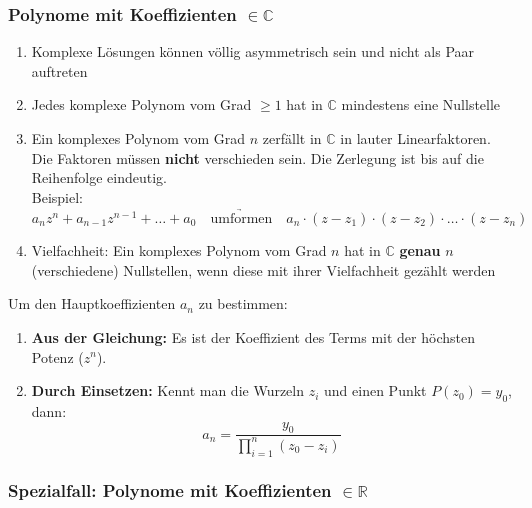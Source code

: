 \subsubsection{Polynome mit Koeffizienten $\bm{\in \mathbb{C}}$}


\smallskip

\begin{enumerate}[itemsep=0.2cm]
    \item Komplexe Lösungen können völlig asymmetrisch sein und nicht als Paar auftreten
    \item Jedes komplexe Polynom vom Grad $\geq 1$ hat in $\mathbb{C}$ mindestens eine Nullstelle
    \item Ein komplexes Polynom vom Grad $n$ zerfällt in $\mathbb{C}$ in lauter Linearfaktoren. \\
          Die Faktoren müssen \textbf{nicht} verschieden sein. Die Zerlegung ist bis auf die Reihenfolge eindeutig. \\
          Beispiel: $a_n z^n + a_{n-1}z^{n-1} + \ldots + a_0 \quad \underrightarrow{\text{umformen}} \quad a_n \cdot (z - z_1) \cdot (z - z_2) \cdot \ldots \cdot (z - z_n)$
    \item Vielfachheit: Ein komplexes Polynom vom Grad $n$ hat in $\mathbb{C}$ \textbf{genau} $n$ (verschiedene) Nullstellen, wenn diese mit ihrer
          Vielfachheit gezählt werden
\end{enumerate}

\medskip


Um den Hauptkoeffizienten \textbf{$a_n$} zu bestimmen:
\begin{enumerate}
    \item \textbf{Aus der Gleichung:} Es ist der Koeffizient des Terms mit der höchsten Potenz ($z^n$).
    \item \textbf{Durch Einsetzen:} Kennt man die Wurzeln $z_i$ und einen Punkt $P(z_0) = y_0$, dann:
          \[ a_n = \frac{y_0}{\prod_{i=1}^{n} (z_0 - z_i)} \]
\end{enumerate}

\subsubsection{Spezialfall: Polynome mit Koeffizienten $\bm{\in \mathbb{R}}$}


